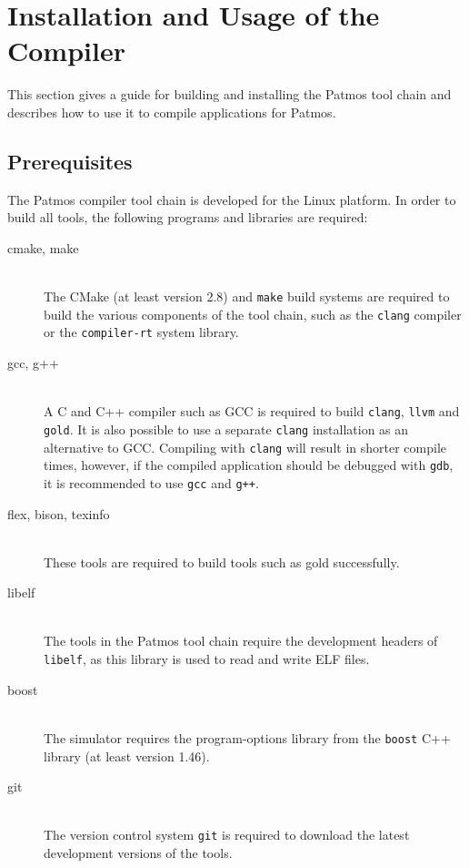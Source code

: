 
\chapter{Installation and Usage of the Compiler}
\label{sec:using_the_compiler}

This section gives a guide for building and installing the Patmos
tool chain and describes how to use it to compile applications for Patmos. 

\section{Prerequisites}

The Patmos compiler tool chain is developed for the Linux platform. 
In order to build all tools, the following programs and libraries are required:

\begin{description}
\item[cmake, make] \hfill\\
The CMake (at least version 2.8) and \texttt{make} build systems are required to build the
various components of the tool chain, such as the \texttt{clang} compiler or the \texttt{compiler-rt} system library.
\medskip

\item[gcc, g++] \hfill\\
A C and C++ compiler such as GCC is required to build \texttt{clang}, \texttt{llvm}
and \texttt{gold}. It is also possible to use a separate \texttt{clang} installation as 
an alternative to GCC. Compiling with \texttt{clang} will result in shorter compile
times, however, if the compiled application should be debugged with \texttt{gdb}, it is
recommended to use \texttt{gcc} and \texttt{g++}.
\medskip

\item[flex, bison, texinfo] \hfill\\
These tools are required to build tools such as gold successfully.
\medskip

\item[libelf] \hfill\\
The tools in the Patmos tool chain require the development headers of \texttt{libelf},
as this library is used to read and write ELF files.
\medskip

\item[boost] \hfill\\
The simulator requires the program-options library from the \texttt{boost} C++ library
(at least version 1.46).
\medskip

\item[git] \hfill\\
The version control system \texttt{git} is required 
to download the latest development versions of the tools. 
\end{description}

